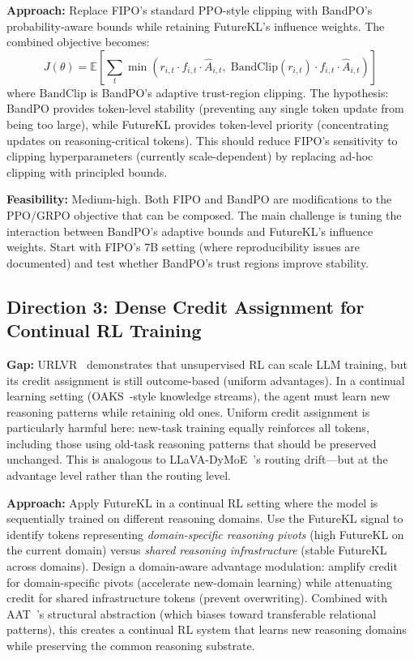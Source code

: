 \documentclass[11pt]{article}
\begin{document}
\textbf{Approach:} Replace FIPO's standard PPO-style clipping with BandPO's probability-aware bounds while retaining FutureKL's influence weights. The combined objective becomes:
\begin{equation}
J(\theta) = \mathbb{E}\!\left[\sum_t \min\!\left(r_{i,t} \cdot f_{i,t} \cdot \hat{A}_{i,t},\; \mathrm{BandClip}(r_{i,t}) \cdot f_{i,t} \cdot \hat{A}_{i,t}\right)\right]
\end{equation}
where $\mathrm{BandClip}$ is BandPO's adaptive trust-region clipping. The hypothesis: BandPO provides token-level stability (preventing any single token update from being too large), while FutureKL provides token-level priority (concentrating updates on reasoning-critical tokens). This should reduce FIPO's sensitivity to clipping hyperparameters (currently scale-dependent) by replacing ad-hoc clipping with principled bounds.

\textbf{Feasibility:} Medium-high. Both FIPO and BandPO are modifications to the PPO/GRPO objective that can be composed. The main challenge is tuning the interaction between BandPO's adaptive bounds and FutureKL's influence weights. Start with FIPO's 7B setting (where reproducibility issues are documented) and test whether BandPO's trust regions improve stability.

\subsection{Direction 3: Dense Credit Assignment for Continual RL Training}

\textbf{Gap:} URLVR~\cite{urlvr} demonstrates that unsupervised RL can scale LLM training, but its credit assignment is still outcome-based (uniform advantages). In a continual learning setting (OAKS~\cite{oaks}-style knowledge streams), the agent must learn new reasoning patterns while retaining old ones. Uniform credit assignment is particularly harmful here: new-task training equally reinforces all tokens, including those using old-task reasoning patterns that should be preserved unchanged. This is analogous to LLaVA-DyMoE~\cite{dymoe}'s routing drift---but at the advantage level rather than the routing level.

\textbf{Approach:} Apply FutureKL in a continual RL setting where the model is sequentially trained on different reasoning domains. Use the FutureKL signal to identify tokens representing \textit{domain-specific reasoning pivots} (high FutureKL on the current domain) versus \textit{shared reasoning infrastructure} (stable FutureKL across domains). Design a domain-aware advantage modulation: amplify credit for domain-specific pivots (accelerate new-domain learning) while attenuating credit for shared infrastructure tokens (prevent overwriting). Combined with AAT~\cite{aat}'s structural abstraction (which biases toward transferable relational patterns), this creates a continual RL system that learns new reasoning domains while preserving the common reasoning substrate.
\end{document}

